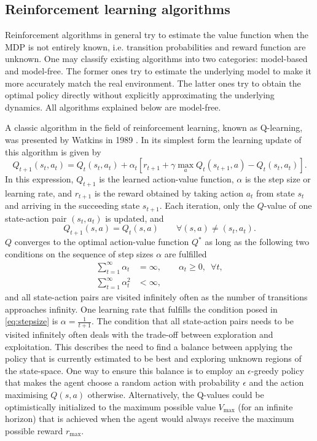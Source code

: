 \documentclass[../main.tex]{subfiles}
\begin{document}
\subsection{Reinforcement learning algorithms}
Reinforcement algorithms in general try to estimate the value function when the MDP is not entirely known, i.e. transition probabilities and reward function are unknown. One may classify existing algorithms into two categories: model-based and model-free. The former ones try to estimate the underlying model to make it more accurately match the real environment. The latter ones try to obtain the optimal policy directly without explicitly approximating the underlying dynamics. All algorithms explained below are model-free. \par
A classic algorithm in the field of reinforcement learning, known as Q-learning, was presented by Watkins in 1989 \cite{watkins1992q}. In its simplest form the learning update of this algorithm is given by
\begin{equation}
Q_{t+1}(s_t,a_t) = Q_{t}(s_t,a_t) + \alpha_t \left[ r_{t+1}+\gamma \max_a Q_{t}(s_{t+1},a) - Q_{t}(s_t,a_t)\right].
\end{equation}
In this expression, $Q_{t+1}$ is the learned action-value function, $\alpha$ is the step size or learning rate, and $r_{t+1}$ is the reward obtained by taking action $a_t$ from state $s_t$ and arriving in the succeeding state $s_{t+1}$.
Each iteration, only the $Q$-value of one state-action pair $(s_t,a_t)$ is updated, and
\begin{equation}
    Q_{t+1}(s,a) = Q_{t}(s,a) \qquad \forall (s,a) \neq (s_t,a_t).
\end{equation}
$Q$ converges to the optimal action-value function $Q^*$ as long as the following two conditions on the sequence of step sizes $\alpha$ are fulfilled \cite{jaakkola1994convergence}
\begin{align}\label{eq:stepsize}
    \sum_{t=1}^\infty \alpha_t &= \infty, \qquad \alpha_t\geq 0, \enspace \forall t, \\
    \sum_{t=1}^\infty \alpha_t^2 &< \infty ,
\end{align}
and all state-action pairs are visited infinitely often as the number of transitions approaches infinity. One learning rate that fulfills the condition posed in \eqref{eq:stepsize} is $\alpha = \frac{1}{t+1}$. The condition that all state-action pairs needs to be visited infinitely often deals with the trade-off between exploration and exploitation. This describes the need to find a balance between applying the policy that is currently estimated to be best and exploring unknown regions of the state-space. One way to ensure this balance is to employ an $\epsilon$-greedy policy that makes the agent choose a random action with probability $\epsilon$ and the action maximising $Q(s,a)$ otherwise. Alternatively, the Q-values could be optimistically initialized to the maximum possible value $V_{\max}$ (for an infinite horizon) that is achieved when the agent would always receive the maximum possible reward $r_{\max}$. 
\end{document}
